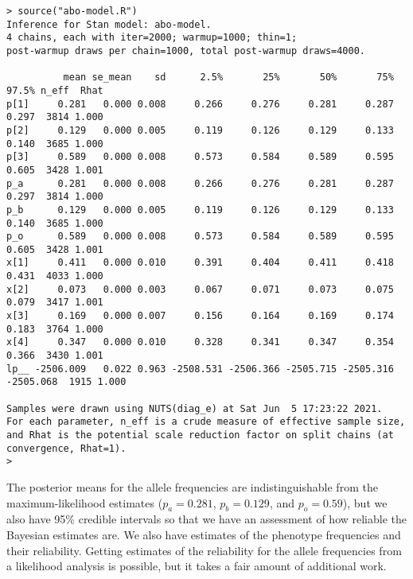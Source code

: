 \documentclass[12pt]{article}
\begin{document}
{\footnotesize
\begin{verbatim}
> source("abo-model.R")
Inference for Stan model: abo-model.
4 chains, each with iter=2000; warmup=1000; thin=1; 
post-warmup draws per chain=1000, total post-warmup draws=4000.

          mean se_mean    sd      2.5%       25%       50%       75%     97.5% n_eff  Rhat
p[1]     0.281   0.000 0.008     0.266     0.276     0.281     0.287     0.297  3814 1.000
p[2]     0.129   0.000 0.005     0.119     0.126     0.129     0.133     0.140  3685 1.000
p[3]     0.589   0.000 0.008     0.573     0.584     0.589     0.595     0.605  3428 1.001
p_a      0.281   0.000 0.008     0.266     0.276     0.281     0.287     0.297  3814 1.000
p_b      0.129   0.000 0.005     0.119     0.126     0.129     0.133     0.140  3685 1.000
p_o      0.589   0.000 0.008     0.573     0.584     0.589     0.595     0.605  3428 1.001
x[1]     0.411   0.000 0.010     0.391     0.404     0.411     0.418     0.431  4033 1.000
x[2]     0.073   0.000 0.003     0.067     0.071     0.073     0.075     0.079  3417 1.001
x[3]     0.169   0.000 0.007     0.156     0.164     0.169     0.174     0.183  3764 1.000
x[4]     0.347   0.000 0.010     0.328     0.341     0.347     0.354     0.366  3430 1.001
lp__ -2506.009   0.022 0.963 -2508.531 -2506.366 -2505.715 -2505.316 -2505.068  1915 1.000

Samples were drawn using NUTS(diag_e) at Sat Jun  5 17:23:22 2021.
For each parameter, n_eff is a crude measure of effective sample size,
and Rhat is the potential scale reduction factor on split chains (at 
convergence, Rhat=1).
>
\end{verbatim}
}
\noindent The posterior means for the allele frequencies are indistinguishable
from the maximum-likelihood estimates ($p_a = 0.281$, $p_b = 0.129$,
and $p_o = 0.59$), but we also have 95\% credible intervals so that we
have an assessment of how reliable the Bayesian estimates are. We also
have estimates of the phenotype frequencies and their
reliability. Getting estimates of the reliability for the allele
frequencies from a likelihood analysis is possible, but it takes a
fair amount of additional work.




\ccLicense
\end{document}
